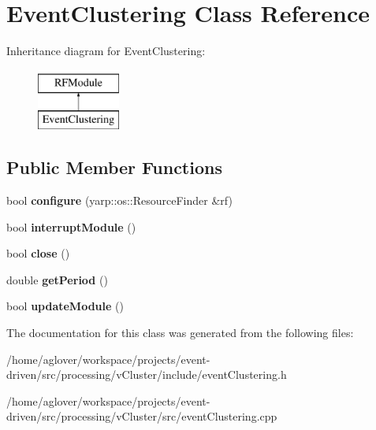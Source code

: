 \hypertarget{classEventClustering}{}\section{Event\+Clustering Class Reference}
\label{classEventClustering}
Inheritance diagram for Event\+Clustering\+:\begin{figure}[H]
\begin{center}
\leavevmode
\includegraphics[height=2.000000cm]{classEventClustering}
\end{center}
\end{figure}
\subsection*{Public Member Functions}
\begin{DoxyCompactItemize}
\item 
bool {\bfseries configure} (yarp\+::os\+::\+Resource\+Finder \&rf)\hypertarget{classEventClustering_a9111f5db3d21a2a80bef0ac5a6996d06}{}\label{classEventClustering_a9111f5db3d21a2a80bef0ac5a6996d06}

\item 
bool {\bfseries interrupt\+Module} ()\hypertarget{classEventClustering_adb2bb1f480ac61629327d5170dd64398}{}\label{classEventClustering_adb2bb1f480ac61629327d5170dd64398}

\item 
bool {\bfseries close} ()\hypertarget{classEventClustering_af27e70c40cdfddab01c1fffed35620a3}{}\label{classEventClustering_af27e70c40cdfddab01c1fffed35620a3}

\item 
double {\bfseries get\+Period} ()\hypertarget{classEventClustering_afe356ead5fe50d67b2007e3f99f7818f}{}\label{classEventClustering_afe356ead5fe50d67b2007e3f99f7818f}

\item 
bool {\bfseries update\+Module} ()\hypertarget{classEventClustering_a25159637f1dc8c9cd27cde191b7296d2}{}\label{classEventClustering_a25159637f1dc8c9cd27cde191b7296d2}

\end{DoxyCompactItemize}


The documentation for this class was generated from the following files\+:\begin{DoxyCompactItemize}
\item 
/home/aglover/workspace/projects/event-\/driven/src/processing/v\+Cluster/include/event\+Clustering.\+h\item 
/home/aglover/workspace/projects/event-\/driven/src/processing/v\+Cluster/src/event\+Clustering.\+cpp\end{DoxyCompactItemize}
